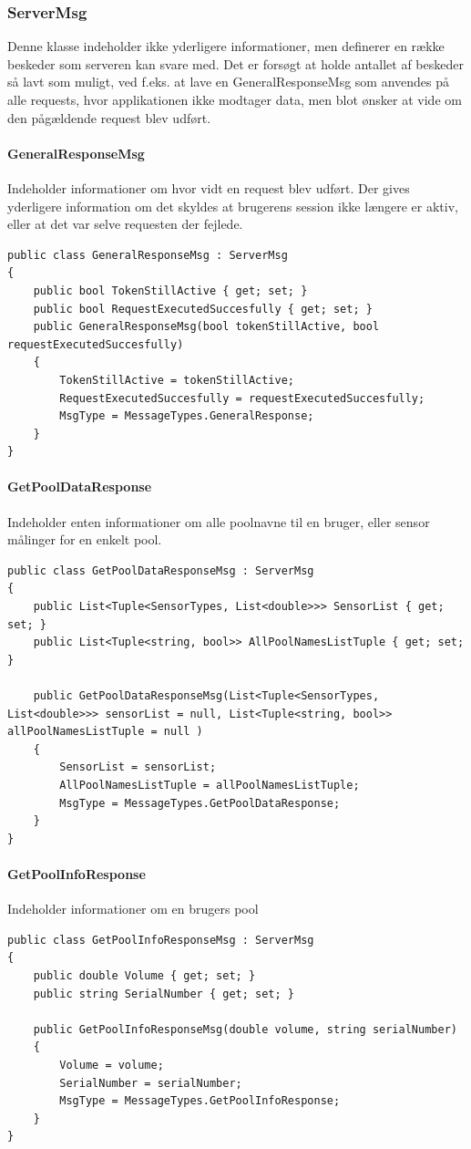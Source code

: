 \subsubsection{ServerMsg}
Denne klasse indeholder ikke yderligere informationer, men definerer en række beskeder som serveren kan svare med. Det er forsøgt at holde antallet af beskeder så lavt som muligt, ved f.eks. at lave en GeneralResponseMsg som anvendes på alle requests, hvor applikationen ikke modtager data, men blot ønsker at vide om den pågældende request blev udført. 

\paragraph{GeneralResponseMsg}
Indeholder informationer om hvor vidt en request blev udført. Der gives yderligere information om det skyldes at brugerens session ikke længere er aktiv, eller at det var selve requesten der fejlede.
\begin{lstlisting}[caption=GeneralResponseMsg, label=code:GeneralResponseMsg]
public class GeneralResponseMsg : ServerMsg
{
	public bool TokenStillActive { get; set; }
	public bool RequestExecutedSuccesfully { get; set; }
	public GeneralResponseMsg(bool tokenStillActive, bool requestExecutedSuccesfully)
	{
		TokenStillActive = tokenStillActive;
		RequestExecutedSuccesfully = requestExecutedSuccesfully;
		MsgType = MessageTypes.GeneralResponse;
	}
}
\end{lstlisting}

\paragraph{GetPoolDataResponse}
Indeholder enten informationer om alle poolnavne til en bruger, eller sensor målinger for en enkelt pool.
\begin{lstlisting}[caption=GetPoolDataResponse, label=code:GetPoolDataResponse]
public class GetPoolDataResponseMsg : ServerMsg
{
	public List<Tuple<SensorTypes, List<double>>> SensorList { get; set; }
	public List<Tuple<string, bool>> AllPoolNamesListTuple { get; set; }
	
	public GetPoolDataResponseMsg(List<Tuple<SensorTypes, List<double>>> sensorList = null, List<Tuple<string, bool>> allPoolNamesListTuple = null )
	{
		SensorList = sensorList;
		AllPoolNamesListTuple = allPoolNamesListTuple;
		MsgType = MessageTypes.GetPoolDataResponse;
	}
}
\end{lstlisting}

\paragraph{GetPoolInfoResponse}
Indeholder informationer om en brugers pool
\begin{lstlisting}[caption=GetPoolInfoResponse, label=code:GetPoolInfoResponse]
public class GetPoolInfoResponseMsg : ServerMsg
{
	public double Volume { get; set; }
	public string SerialNumber { get; set; }
	
	public GetPoolInfoResponseMsg(double volume, string serialNumber)
	{
		Volume = volume;
		SerialNumber = serialNumber;
		MsgType = MessageTypes.GetPoolInfoResponse;
	}
}
\end{lstlisting}

